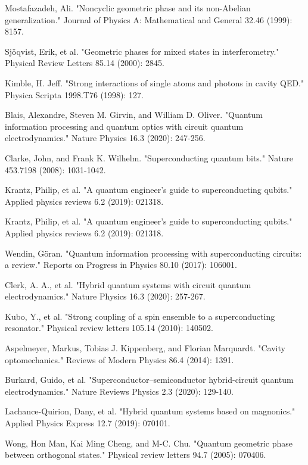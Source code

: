\begin{thebibliography}{9}
Mostafazadeh, Ali. "Noncyclic geometric phase and its non-Abelian generalization." Journal of Physics A: Mathematical and General 32.46 (1999): 8157.

Sjöqvist, Erik, et al. "Geometric phases for mixed states in interferometry." Physical Review Letters 85.14 (2000): 2845.


Kimble, H. Jeff. "Strong interactions of single atoms and photons in cavity QED." Physica Scripta 1998.T76 (1998): 127.

Blais, Alexandre, Steven M. Girvin, and William D. Oliver. "Quantum information processing and quantum optics with circuit quantum electrodynamics." Nature Physics 16.3 (2020): 247-256.

Clarke, John, and Frank K. Wilhelm. "Superconducting quantum bits." Nature 453.7198 (2008): 1031-1042.

Krantz, Philip, et al. "A quantum engineer's guide to superconducting qubits." Applied physics reviews 6.2 (2019): 021318.

Krantz, Philip, et al. "A quantum engineer's guide to superconducting qubits." Applied physics reviews 6.2 (2019): 021318.

Wendin, Göran. "Quantum information processing with superconducting circuits: a review." Reports on Progress in Physics 80.10 (2017): 106001.

Clerk, A. A., et al. "Hybrid quantum systems with circuit quantum electrodynamics." Nature Physics 16.3 (2020): 257-267.

Kubo, Y., et al. "Strong coupling of a spin ensemble to a superconducting resonator." Physical review letters 105.14 (2010): 140502.

Aspelmeyer, Markus, Tobias J. Kippenberg, and Florian Marquardt. "Cavity optomechanics." Reviews of Modern Physics 86.4 (2014): 1391.

Burkard, Guido, et al. "Superconductor–semiconductor hybrid-circuit quantum electrodynamics." Nature Reviews Physics 2.3 (2020): 129-140.

Lachance-Quirion, Dany, et al. "Hybrid quantum systems based on magnonics." Applied Physics Express 12.7 (2019): 070101.

Wong, Hon Man, Kai Ming Cheng, and M-C. Chu. "Quantum geometric phase between orthogonal states." Physical review letters 94.7 (2005): 070406.


\end{thebibliography}
